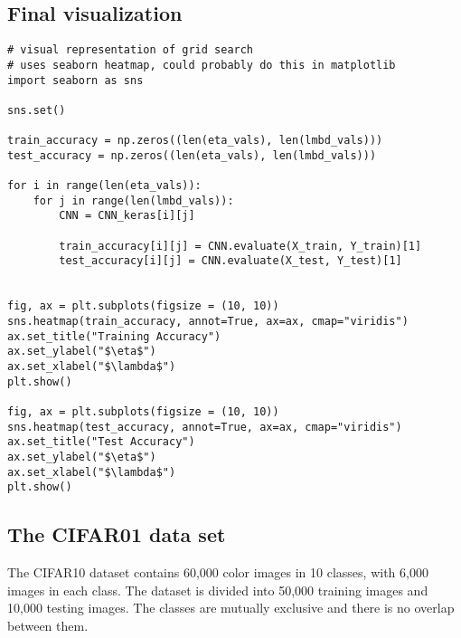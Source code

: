 \documentclass[%
oneside,                 %
final,                   %
10pt]{article}
\begin{document}
\subsection*{Final visualization}
































\begin{verbatim}
# visual representation of grid search
# uses seaborn heatmap, could probably do this in matplotlib
import seaborn as sns

sns.set()

train_accuracy = np.zeros((len(eta_vals), len(lmbd_vals)))
test_accuracy = np.zeros((len(eta_vals), len(lmbd_vals)))

for i in range(len(eta_vals)):
    for j in range(len(lmbd_vals)):
        CNN = CNN_keras[i][j]

        train_accuracy[i][j] = CNN.evaluate(X_train, Y_train)[1]
        test_accuracy[i][j] = CNN.evaluate(X_test, Y_test)[1]

        
fig, ax = plt.subplots(figsize = (10, 10))
sns.heatmap(train_accuracy, annot=True, ax=ax, cmap="viridis")
ax.set_title("Training Accuracy")
ax.set_ylabel("$\eta$")
ax.set_xlabel("$\lambda$")
plt.show()

fig, ax = plt.subplots(figsize = (10, 10))
sns.heatmap(test_accuracy, annot=True, ax=ax, cmap="viridis")
ax.set_title("Test Accuracy")
ax.set_ylabel("$\eta$")
ax.set_xlabel("$\lambda$")
plt.show()

\end{verbatim}


\subsection*{The CIFAR01 data set}

The CIFAR10 dataset contains 60,000 color images in 10 classes, with
6,000 images in each class. The dataset is divided into 50,000
training images and 10,000 testing images. The classes are mutually
exclusive and there is no overlap between them.
\end{document}
